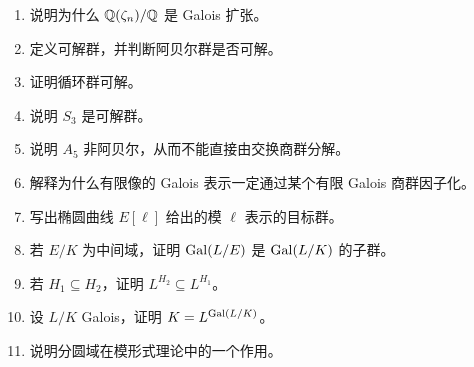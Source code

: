 \begin{enumerate}[label=\textbf{\arabic*.}, leftmargin=*, itemsep=0.5em]
\item \basic 说明为什么 $\mathbb{Q}(\zeta_n)/\mathbb{Q}$ 是 Galois 扩张。
\item \basic 定义可解群，并判断阿贝尔群是否可解。
\item \basic 证明循环群可解。
\item \basic 说明 $S_3$ 是可解群。
\item \basic 说明 $A_5$ 非阿贝尔，从而不能直接由交换商群分解。
\item \basic 解释为什么有限像的 Galois 表示一定通过某个有限 Galois 商群因子化。
\item \basic 写出椭圆曲线 $E[\ell]$ 给出的模 $\ell$ 表示的目标群。
\item \basic 若 $E/K$ 为中间域，证明 $\mathrm{Gal}(L/E)$ 是 $\mathrm{Gal}(L/K)$ 的子群。
\item \basic 若 $H_1\subseteq H_2$，证明 $L^{H_2}\subseteq L^{H_1}$。
\item \basic 设 $L/K$ Galois，证明 $K=L^{\mathrm{Gal}(L/K)}$。
\item \basic 说明分圆域在模形式理论中的一个作用。
\end{enumerate}

